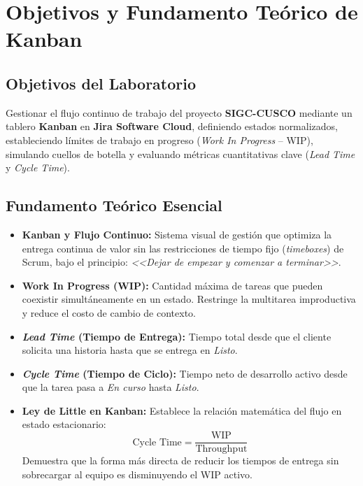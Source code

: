 \section{Objetivos y Fundamento Teórico de Kanban}

\subsection{Objetivos del Laboratorio}
Gestionar el flujo continuo de trabajo del proyecto \textbf{SIGC-CUSCO} mediante un tablero \textbf{Kanban} en \textbf{Jira Software Cloud}, definiendo estados normalizados, estableciendo límites de trabajo en progreso (\textit{Work In Progress} -- WIP), simulando cuellos de botella y evaluando métricas cuantitativas clave (\textit{Lead Time} y \textit{Cycle Time}).

\subsection{Fundamento Teórico Esencial}
\begin{itemize}[leftmargin=*]
    \item \textbf{Kanban y Flujo Continuo:} Sistema visual de gestión que optimiza la entrega continua de valor sin las restricciones de tiempo fijo (\textit{timeboxes}) de Scrum, bajo el principio: \textit{<<Dejar de empezar y comenzar a terminar>>}.
    \item \textbf{Work In Progress (WIP):} Cantidad máxima de tareas que pueden coexistir simultáneamente en un estado. Restringe la multitarea improductiva y reduce el costo de cambio de contexto.
    \item \textbf{\textit{Lead Time} (Tiempo de Entrega):} Tiempo total desde que el cliente solicita una historia hasta que se entrega en \textit{Listo}.
    \item \textbf{\textit{Cycle Time} (Tiempo de Ciclo):} Tiempo neto de desarrollo activo desde que la tarea pasa a \textit{En curso} hasta \textit{Listo}.
    \item \textbf{Ley de Little en Kanban:} Establece la relación matemática del flujo en estado estacionario:
    \begin{equation}
        \text{Cycle Time} = \frac{\text{WIP}}{\text{Throughput}}
    \end{equation}
    Demuestra que la forma más directa de reducir los tiempos de entrega sin sobrecargar al equipo es disminuyendo el WIP activo.
\end{itemize}
